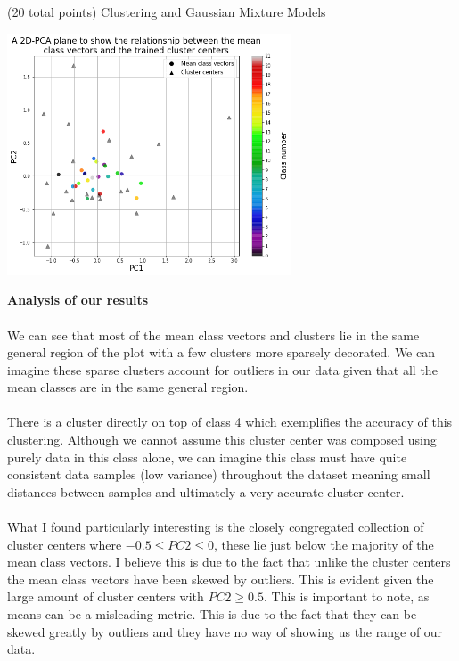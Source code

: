 \documentclass[12pt]{article}
\begin{document}
\begin{question}{(20 total points) Clustering and Gaussian Mixture Models}
\begin{subquestion}
   

      \begin{answerbox}{35em}
        \begin{center}
         \includegraphics[width=0.63\textwidth]{images/q32.png}
        \end{center}
        \footnotesize{\textbf{\underline{Analysis of our results}}}\\
\\
        \scriptsize{
        We can see that most of the mean class vectors and clusters lie in the same general region of the plot with a few clusters more sparsely decorated. We can imagine these sparse clusters account for outliers in our data given that all the mean classes are in the same general region. \\
\\
        There is a cluster directly on top of class 4 which exemplifies the accuracy of this clustering. Although we cannot assume this cluster center was composed using purely data in this class alone,  we can imagine this class must have quite consistent data samples (low variance) throughout the dataset meaning small distances between samples and ultimately a very accurate cluster center.\\
\\
        What I found particularly interesting is the closely congregated collection of cluster centers where $-0.5 \leq PC2 \leq 0$, these lie just below the majority of the mean class vectors. I believe this is due to the fact that unlike the cluster centers the mean class vectors have been skewed by outliers. This is evident given the large amount of cluster centers with $PC2 \geq 0.5$. This is important to note, as means can be a misleading metric. This is due to the fact that they can be skewed greatly by outliers and they have no way of showing us the range of our data.
        }
      \end{answerbox}
  



\end{subquestion}
\end{question}
\end{document}

